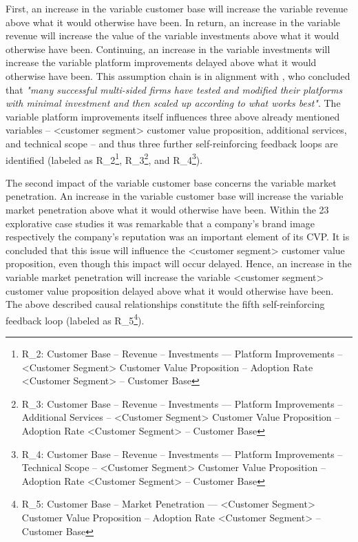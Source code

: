 First, an increase in the variable customer base will increase the variable revenue above what it would otherwise have been. In return, an increase in the variable revenue will increase the value of the variable investments above what it would otherwise have been. Continuing, an increase in the variable investments will increase the variable platform improvements delayed above what it would otherwise have been. This assumption chain is in alignment with \citet[p. 200]{Evans2003}, who concluded that \textit{"many successful multi-sided firms have tested and modified their platforms with minimal investment and then scaled up according to what works best"}. The variable platform improvements itself influences three above already mentioned variables -- <customer segment> customer value proposition, additional services, and technical scope -- and thus three further self-reinforcing feedback loops are identified (labeled as R\_2\footnote{R\_2: Customer Base -- Revenue -- Investments --- Platform Improvements -- <Customer Segment> Customer Value Proposition -- Adoption Rate <Customer Segment> -- Customer Base}, R\_3\footnote{R\_3: Customer Base -- Revenue -- Investments --- Platform Improvements -- Additional Services -- <Customer Segment> Customer Value Proposition -- Adoption Rate <Customer Segment> -- Customer Base}, and R\_4\footnote{R\_4: Customer Base -- Revenue -- Investments --- Platform Improvements -- Technical Scope -- <Customer Segment> Customer Value Proposition -- Adoption Rate <Customer Segment> -- Customer Base}).

The second impact of the variable customer base concerns the variable market penetration. An increase in the variable customer base will increase the variable market penetration above what it would otherwise have been. Within the 23 explorative case studies it was remarkable that a company's brand image respectively the company's reputation was an important element of its \ac{CVP}. It is concluded that this issue will influence the <customer segment> customer value proposition, even though this impact will occur delayed. Hence, an increase in the variable market penetration will increase the variable <customer segment> customer value proposition delayed above what it would otherwise have been. The above described causal relationships constitute the fifth self-reinforcing feedback loop (labeled as R\_5\footnote{R\_5: Customer Base -- Market Penetration --- <Customer Segment> Customer Value Proposition -- Adoption Rate <Customer Segment> -- Customer Base}).

